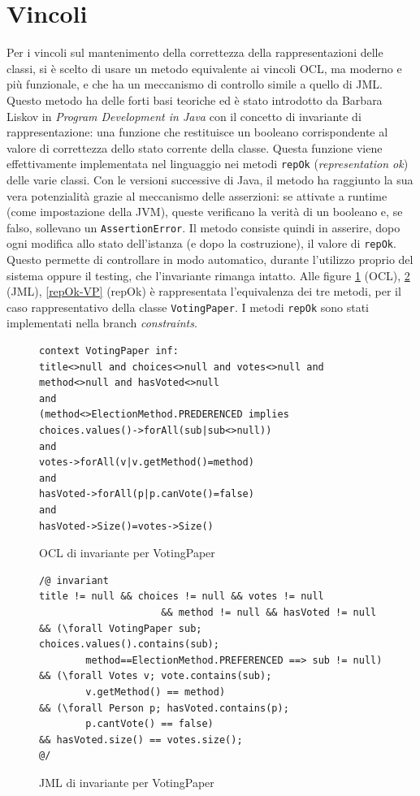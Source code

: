 \section{Vincoli}\label{vincoli}
Per i vincoli sul mantenimento della correttezza della rappresentazioni delle classi, si è scelto di usare un metodo equivalente ai vincoli OCL, ma moderno e più funzionale, e che ha un meccanismo di controllo simile a quello di JML. Questo metodo ha delle forti basi teoriche ed è stato introdotto da Barbara Liskov in \emph{Program Development in Java} con il concetto di invariante di rappresentazione: una funzione che restituisce un booleano corrispondente al valore di correttezza dello stato corrente della classe. Questa funzione viene effettivamente implementata nel linguaggio nei metodi \verb!repOk! (\emph{representation ok}) delle varie classi. Con le versioni successive di Java, il metodo ha raggiunto la sua vera potenzialità grazie al meccanismo delle asserzioni: se attivate a runtime (come impostazione della JVM), queste verificano la verità di un booleano e, se falso, sollevano un \verb!AssertionError!. Il metodo consiste quindi in asserire, dopo ogni modifica allo stato dell'istanza (e dopo la costruzione), il valore di \verb!repOk!. Questo permette di controllare in modo automatico, durante l'utilizzo proprio del sistema oppure il testing, che l'invariante rimanga intatto. Alle figure \ref{OCL-VP} (OCL), \ref{JML-VP} (JML), \ref{repOk-VP} (repOk) è rappresentata l'equivalenza dei tre metodi, per il caso rappresentativo della classe \verb!VotingPaper!. I metodi \verb!repOk! sono stati implementati nella branch \emph{constraints}.

\begin{figure}
	\centering
	\begin{verbatim}
context VotingPaper inf:
title<>null and choices<>null and votes<>null and method<>null and hasVoted<>null
and
(method<>ElectionMethod.PREDERENCED implies choices.values()->forAll(sub|sub<>null))
and
votes->forAll(v|v.getMethod()=method)
and
hasVoted->forAll(p|p.canVote()=false)
and
hasVoted->Size()=votes->Size()
        \end{verbatim}
	\caption{OCL di invariante per VotingPaper}\label{OCL-VP}
\end{figure}

\begin{figure}
	\centering
	\begin{verbatim}
/@ invariant
title != null && choices != null && votes != null
                     && method != null && hasVoted != null
&& (\forall VotingPaper sub; choices.values().contains(sub);
        method==ElectionMethod.PREFERENCED ==> sub != null)
&& (\forall Votes v; vote.contains(sub);
        v.getMethod() == method)
&& (\forall Person p; hasVoted.contains(p);
        p.cantVote() == false)
&& hasVoted.size() == votes.size();
@/
        \end{verbatim}
	\caption{JML di invariante per VotingPaper}\label{JML-VP}
\end{figure}

